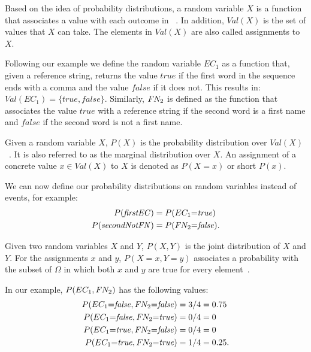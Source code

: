 \bigskip

Based on the idea of \glspl{probability distribution}, a \gls{random variable} $X$ is a \gls{function} that associates a value with each outcome in ~\cite{koller2009probabilistic}.
In addition, $\mathit{Val}(X)$ is the set of values that $X$ can take.
The elements in $\mathit{Val}(X)$ are also called \glspl{assignment} to $X$.

Following our example we define the \gls{random variable} $EC_1$ as a \gls{function} that, given a reference string, returns the value $\mathit{true}$ if the first word in the sequence ends with a comma and the value $\mathit{false}$ if it does not.
This results in: $\mathit{Val}(EC_1)=\{\mathit{true}, \mathit{false}\}$.
Similarly, $F\hspace{-0.07em} N_2$ is defined as the function that associates the value $\mathit{true}$ with a reference string if the second word is a first name and $\mathit{false}$ if the second word is not a first name.

\bigskip

Given a \gls{random variable} $X$, $P(X)$ is the \gls{probability distribution} over $\mathit{Val}(X)$~\cite{koller2009probabilistic}.
It is also referred to as the \gls{marginal distribution} over $X$.
An \gls{assignment} of a concrete value $x\in \mathit{Val}(X)$ to $X$ is denoted as $P(X=x)$ or short $P(x)$.

We can now define our \glspl{probability distribution} on \glspl{random variable} instead of \glspl{event}, for example:
\begin{equation*}
  \begin{split}
    P(\mathit{firstEC})&= P(EC_1{=}\mathit{true})\\
    P(\mathit{secondNotFN})&= P(F\hspace{-0.07em} N_2{=}\mathit{false}).
  \end{split}
\end{equation*}

\bigskip

Given two \glspl{random variable} $X$ and $Y$, $P(X,Y)$ is the \gls{joint distribution} of $X$ and $Y$.
For the assignments $x$ and $y$, $P(X{=}x,Y{=}y)$ associates a probability with the subset of $\Omega$ in which both $x$ and $y$ are true for every element~\cite{koller2009probabilistic}.

In our example, $P(EC_1,F\hspace{-0.07em} N_2)$ has the following values:
\begin{equation*}
  \begin{split}
    P(EC_1{=}\mathit{false},F\hspace{-0.07em} N_2{=}\mathit{false})&=3/4=0.75\\
    P(EC_1{=}\mathit{false},F\hspace{-0.07em} N_2{=}\mathit{true})&=0/4=0\\
    P(EC_1{=}\mathit{true},F\hspace{-0.07em} N_2{=}\mathit{false})&=0/4=0\\
    P(EC_1{=}\mathit{true},F\hspace{-0.07em} N_2{=}\mathit{true})&=1/4=0.25.
  \end{split}
\end{equation*}

